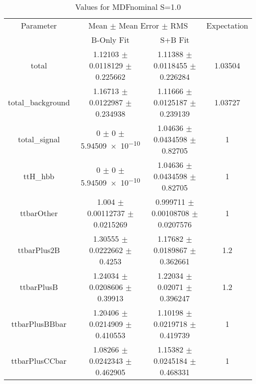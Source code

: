 \begin{table}
\centering
\caption{Values for MDFnominal S=1.0}
\begin{tabular}{cccc}
\toprule
Parameter & \multicolumn{2}{c}{Mean $\pm$ Mean Error $\pm$ RMS} & Expectation\\
 & B-Only Fit & S+B Fit & \\
\midrule
total & \num{1.12103} $\pm$ \num{0.0118129} $\pm$ \num{0.225662} & \num{1.11388} $\pm$ \num{0.0118455} $\pm$ \num{0.226284} & \num{1.03504}\\
total\_background & \num{1.16713} $\pm$ \num{0.0122987} $\pm$ \num{0.234938} & \num{1.11666} $\pm$ \num{0.0125187} $\pm$ \num{0.239139} & \num{1.03727}\\
total\_signal & \num{0} $\pm$ \num{0} $\pm$ \num{5.94509e-10} & \num{1.04636} $\pm$ \num{0.0434598} $\pm$ \num{0.82705} & \num{1}\\
ttH\_hbb & \num{0} $\pm$ \num{0} $\pm$ \num{5.94509e-10} & \num{1.04636} $\pm$ \num{0.0434598} $\pm$ \num{0.82705} & \num{1}\\
ttbarOther & \num{1.004} $\pm$ \num{0.00112737} $\pm$ \num{0.0215269} & \num{0.999711} $\pm$ \num{0.00108708} $\pm$ \num{0.0207576} & \num{1}\\
ttbarPlus2B & \num{1.30555} $\pm$ \num{0.0222662} $\pm$ \num{0.4253} & \num{1.17682} $\pm$ \num{0.0189867} $\pm$ \num{0.362661} & \num{1.2}\\
ttbarPlusB & \num{1.24034} $\pm$ \num{0.0208606} $\pm$ \num{0.39913} & \num{1.22034} $\pm$ \num{0.02071} $\pm$ \num{0.396247} & \num{1.2}\\
ttbarPlusBBbar & \num{1.20406} $\pm$ \num{0.0214909} $\pm$ \num{0.410553} & \num{1.10198} $\pm$ \num{0.0219718} $\pm$ \num{0.419739} & \num{1}\\
ttbarPlusCCbar & \num{1.08266} $\pm$ \num{0.0242343} $\pm$ \num{0.462905} & \num{1.15382} $\pm$ \num{0.0245184} $\pm$ \num{0.468331} & \num{1}\\
\bottomrule
\end{tabular}
\end{table}